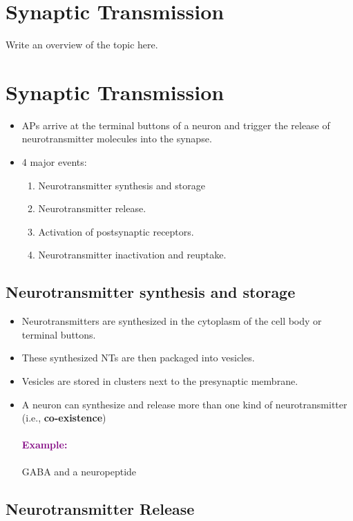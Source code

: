 \documentclass[12pt,a4paper]{article}
\newcommand{\example}[1]{\paragraph{\textcolor{purple}{Example:}} #1}
\begin{document}
	\section*{Synaptic Transmission}
	Write an overview of the topic here.
	
	\section{Synaptic Transmission}
	
	\begin{itemize}
		\item APs arrive at the terminal buttons of a neuron and trigger the release of neurotransmitter molecules into the synapse. 
		\item 4 major events: 
		\begin{enumerate}
			\item Neurotransmitter synthesis and storage
			\item Neurotransmitter release.
			\item Activation of postsynaptic receptors.
			\item Neurotransmitter inactivation and reuptake. 
		\end{enumerate}
	\end{itemize}
	
	\subsection{Neurotransmitter synthesis and storage}
	
	\begin{itemize}
		\item Neurotransmitters are synthesized in the cytoplasm of the cell body or terminal buttons. 
		\item These synthesized NTs are then packaged into vesicles. 
		\item Vesicles are stored in clusters next to the presynaptic membrane. 
		\item A neuron can synthesize and release more than one kind of neurotransmitter (i.e., \textbf{co-existence})
		\example{GABA and a neuropeptide}
	\end{itemize}
	
	\subsection{Neurotransmitter Release}
	
\end{document}
